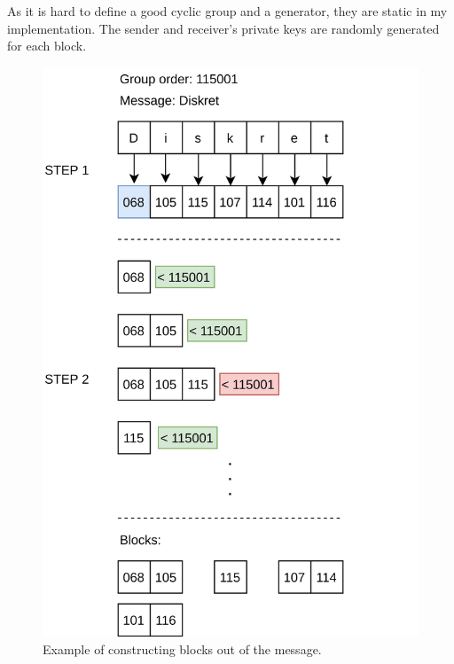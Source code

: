 \documentclass{article}
\begin{document}
As it is hard to define a good cyclic group and a generator, they are static in my implementation. The sender and receiver's private keys are randomly generated for each block.
\begin{figure}
    \centering
    \includegraphics[scale=0.1]{img/construct-blocks.png}
    \caption{Example of constructing blocks out of the message.}
    \label{blocks}
\end{figure}

\newpage
\end{document}
